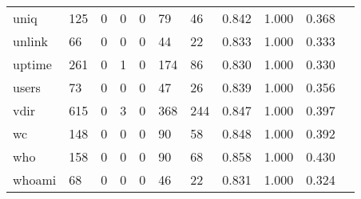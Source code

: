 \begin{longtable}{lp{1.10cm}p{1.10cm}p{1.10cm}p{1.10cm}p{1.10cm}p{1.10cm}p{1.10cm}p{1.10cm}p{1.10cm}p{1.10cm}}
uniq      &                    125 &                                  0 &                                 0 &                                0 &                                79 &                              46 &                          0.842 &                                 1.000 &                               0.368 \\
unlink    &                     66 &                                  0 &                                 0 &                                0 &                                44 &                              22 &                          0.833 &                                 1.000 &                               0.333 \\
uptime    &                    261 &                                  0 &                                 1 &                                0 &                               174 &                              86 &                          0.830 &                                 1.000 &                               0.330 \\
users     &                     73 &                                  0 &                                 0 &                                0 &                                47 &                              26 &                          0.839 &                                 1.000 &                               0.356 \\
vdir      &                    615 &                                  0 &                                 3 &                                0 &                               368 &                             244 &                          0.847 &                                 1.000 &                               0.397 \\
wc        &                    148 &                                  0 &                                 0 &                                0 &                                90 &                              58 &                          0.848 &                                 1.000 &                               0.392 \\
who       &                    158 &                                  0 &                                 0 &                                0 &                                90 &                              68 &                          0.858 &                                 1.000 &                               0.430 \\
whoami    &                     68 &                                  0 &                                 0 &                                0 &                                46 &                              22 &                          0.831 &                                 1.000 &                               0.324 \\

\end{longtable}
